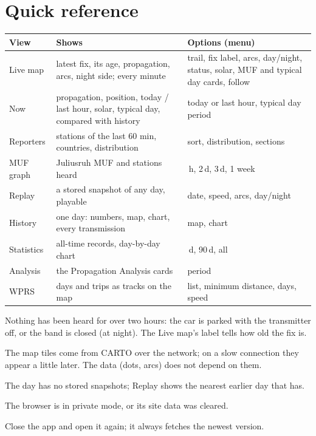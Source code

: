 \documentclass[10pt,a4paper]{article}
\begin{document}
\section{Quick reference}
\begin{table}[H]\small\centering
\begin{tabularx}{\textwidth}{@{}>{\raggedright}p{2.2cm}>{\raggedright}X>{\raggedright\arraybackslash}p{4.3cm}@{}}
\toprule
\textbf{View} & \textbf{Shows} & \textbf{Options (menu)} \\ \midrule
Live map & latest fix, its age, propagation, arcs, night side; every minute & trail, fix label, arcs, day/night, status, solar, MUF and typical day cards, follow \\
Now & propagation, position, today / last hour, solar, typical day, compared with history & today or last hour, typical day period \\
Reporters & stations of the last 60 min, countries, distribution & sort, distribution, sections \\
MUF graph & Juliusruh MUF and stations heard & 24\,h, 2\,d, 3\,d, 1 week \\
Replay & a stored snapshot of any day, playable & date, speed, arcs, day/night \\
History & one day: numbers, map, chart, every transmission & map, chart \\
Statistics & all-time records, day-by-day chart & 30\,d, 90\,d, all \\
Analysis & the Propagation Analysis cards & period \\
WPRS & days and trips as tracks on the map & list, minimum distance, days, speed \\
\bottomrule
\end{tabularx}
\end{table}

\begin{description}[leftmargin=0pt,labelsep=0.4em,itemsep=3pt,font=\normalfont\bfseries]
\item[The status dot is red.] Nothing has been heard for over two hours: the car is parked with the transmitter off, or the band is closed (at night). The Live map's label tells how old the fix is.
\item[The map is grey.] The map tiles come from CARTO over the network; on a slow connection they appear a little later. The data (dots, arcs) does not depend on them.
\item[\emph{No replay data for \dots}] The day has no stored snapshots; Replay shows the nearest earlier day that has.
\item[The settings are forgotten.] The browser is in private mode, or its site data was cleared.
\item[Something looks odd after an update.] Close the app and open it again; it always fetches the newest version.
\end{description}
\end{document}
